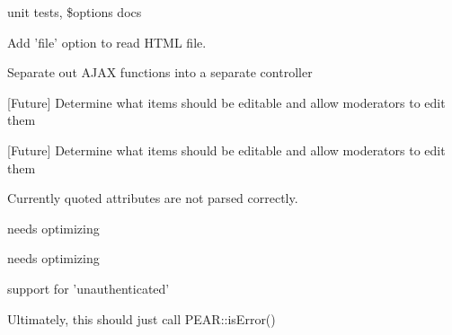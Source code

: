 \begin{DoxyRefList}
\item[\label{todo__todo000069}%
\hypertarget{todo__todo000069}{}%
Namespace \hyperlink{namespace_minify}{Minify} ]unit tests, \$options docs 
\item[\label{todo__todo000068}%
\hypertarget{todo__todo000068}{}%
Global \hyperlink{class_minify___controller___page_ac56e41749f067994f4930eda9c34e0d6}{Minify\-\_\-\-Controller\-\_\-\-Page\-:\-:setup\-Sources} (\$options)]Add 'file' option to read H\-T\-M\-L file.  
\item[\label{todo__todo000004}%
\hypertarget{todo__todo000004}{}%
Global \hyperlink{classpublic__core__global__comments_aa765c5ff2dd4d37e8174e464d397eb49}{public\-\_\-core\-\_\-global\-\_\-comments\-:\-:\-\_\-\-\_\-call} (\$function, \$args)]Separate out A\-J\-A\-X functions into a separate controller  
\item[\label{todo__todo000006}%
\hypertarget{todo__todo000006}{}%
Global \hyperlink{classpublic__core__modcp__modcp_a80163b76d7add10623ed04a2007eca3d}{public\-\_\-core\-\_\-modcp\-\_\-modcp\-:\-:\-\_\-do\-Edit\-Member} ()]\mbox{[}Future\mbox{]} Determine what items should be editable and allow moderators to edit them  
\item[\label{todo__todo000005}%
\hypertarget{todo__todo000005}{}%
Global \hyperlink{classpublic__core__modcp__modcp_ac76c837af89eec839b55ee23c10ab1a4}{public\-\_\-core\-\_\-modcp\-\_\-modcp\-:\-:\-\_\-edit\-Member} ()]\mbox{[}Future\mbox{]} Determine what items should be editable and allow moderators to edit them  
\item[\label{todo__todo000063}%
\hypertarget{todo__todo000063}{}%
Global \hyperlink{class_sabre___cal_d_a_v___i_calendar_util_a0fe4dc0ca6d51ebf5e59890fc94ed4d0}{Sabre\-\_\-\-Cal\-D\-A\-V\-\_\-\-I\-Calendar\-Util\-:\-:to\-X\-C\-A\-L} (\$ical\-Data)]Currently quoted attributes are not parsed correctly.  
\item[\label{todo__todo000065}%
\hypertarget{todo__todo000065}{}%
Global \hyperlink{class_sabre___cal_d_a_v___user_calendars_a9c5c664f8f1e4a514235a31837de9988}{Sabre\-\_\-\-Cal\-D\-A\-V\-\_\-\-User\-Calendars\-:\-:child\-Exists} (\$name)]needs optimizing  
\item[\label{todo__todo000064}%
\hypertarget{todo__todo000064}{}%
Global \hyperlink{class_sabre___cal_d_a_v___user_calendars_a1cfdba129d25b04b73af8290f58ba7c1}{Sabre\-\_\-\-Cal\-D\-A\-V\-\_\-\-User\-Calendars\-:\-:get\-Child} (\$name)]needs optimizing  
\item[\label{todo__todo000066}%
\hypertarget{todo__todo000066}{}%
Global \hyperlink{class_sabre___d_a_v___auth___plugin_a03319a7abc1894a0306d432ec464a358}{Sabre\-\_\-\-D\-A\-V\-\_\-\-Auth\-\_\-\-Plugin\-:\-:after\-Get\-Properties} (\$href, \&\$properties)]support for 'unauthenticated'  
\item[\label{todo__todo000029}%
\hypertarget{todo__todo000029}{}%
Global \hyperlink{class_services___j_s_o_n_a55ae0955466c3970507b122f3f5d1b38}{Services\-\_\-\-J\-S\-O\-N\-:\-:is\-Error} (\$data, \$code=null)]Ultimately, this should just call P\-E\-A\-R\-::is\-Error() 


\end{DoxyRefList}
